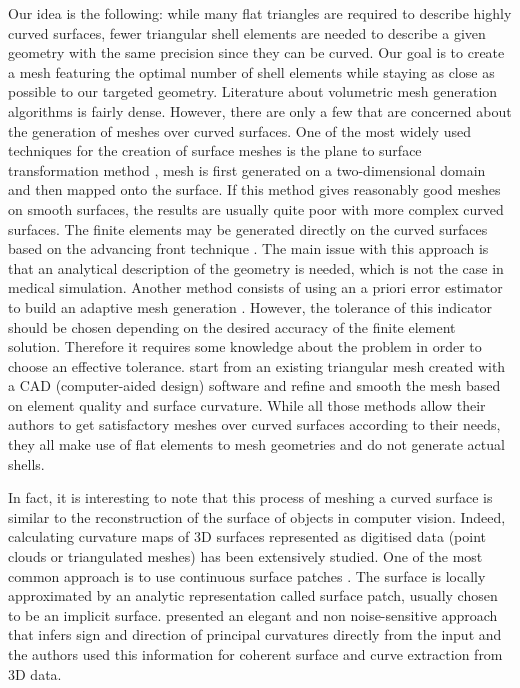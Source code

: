 Our idea is the following: while many flat triangles are required to describe highly curved surfaces, fewer triangular shell elements are needed to describe a given geometry with the same precision since they can be curved. Our goal is to create a mesh featuring the optimal number of shell elements while staying as close as possible to our targeted geometry. Literature about volumetric mesh generation algorithms is fairly dense. However, there are only a few that are concerned about the generation of meshes over curved surfaces. One of the most widely used techniques for the creation of surface meshes is the plane to surface transformation method \citep{Zienkiewicz71}, mesh is first generated on a two-dimensional domain and then mapped onto the surface. If this method gives reasonably good meshes on smooth surfaces, the results are usually quite poor with more complex curved surfaces. The finite elements may be generated directly on the curved surfaces based on the advancing front technique \citep{Lo85,Lau96}. The main issue with this approach is that an analytical description of the geometry is needed, which is not the case in medical simulation. Another method consists of using an a priori error estimator to build an adaptive mesh generation \citep{Baumann97}. However, the tolerance of this indicator should be chosen depending on the desired accuracy of the finite element solution. Therefore it requires some knowledge about the problem in order to choose an effective tolerance. \cite{Bechet02} start from an existing triangular mesh created with a CAD (computer-aided design) software and refine and smooth the mesh based on element quality and surface curvature. While all those methods allow their authors to get satisfactory meshes over curved surfaces according to their needs, they all make use of flat elements to mesh geometries and do not generate actual shells. 

In fact, it is interesting to note that this process of meshing a curved surface is similar to the reconstruction of the surface of objects in computer vision. Indeed, calculating curvature maps of 3D surfaces represented as digitised data (point clouds or triangulated meshes) has been extensively studied. One of the most common approach is to use continuous surface patches \citep{Kolb95,Douros02}. The surface is locally approximated by an analytic representation called surface patch, usually chosen to be an implicit surface. \cite{Tang99} presented an elegant and non noise-sensitive approach that infers sign and direction of principal curvatures directly from the input and the authors used this information for coherent surface and curve extraction from 3D data. 

